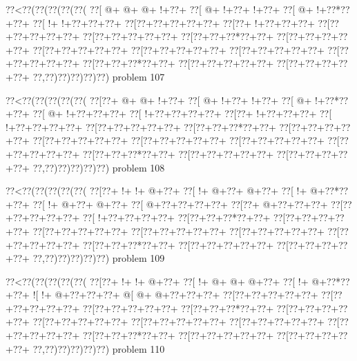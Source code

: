 \vbox{\vbox{\goo
\0??<\0??(\0??(\0??(\0??(\0??(
\0??[\- @+\- @+\- @+\- !+\0??+
\0??[\- @+\- !+\0??+\- !+\0??+
\0??[\- @+\- !+\0??*\0??+\0??+
\0??[\- !+\- !+\0??+\0??+\0??+
\0??[\0??+\0??+\0??+\0??+\0??+
\0??[\0??+\- !+\0??+\0??+\0??+
\0??[\0??+\0??+\0??+\0??+\0??+
\0??[\0??+\0??+\0??+\0??+\0??+
\0??[\0??+\0??+\0??*\0??+\0??+
\0??[\0??+\0??+\0??+\0??+\0??+
\0??[\0??+\0??+\0??+\0??+\0??+
\0??[\0??+\0??+\0??+\0??+\0??+
\0??[\0??+\0??+\0??+\0??+\0??+
\0??[\0??+\0??+\0??+\0??+\0??+
\0??[\0??+\0??+\0??*\0??+\0??+
\0??[\0??+\0??+\0??+\0??+\0??+
\0??[\0??+\0??+\0??+\0??+\0??+
\0??,\0??)\0??)\0??)\0??)\0??)
}
\hfil problem 107\hfil\break
}

\vbox{\vbox{\goo
\0??<\0??(\0??(\0??(\0??(\0??(
\0??[\0??+\- @+\- @+\- !+\0??+
\0??[\- @+\- !+\0??+\- !+\0??+
\0??[\- @+\- !+\0??*\0??+\0??+
\0??[\- @+\- !+\0??+\0??+\0??+
\0??[\- !+\0??+\0??+\0??+\0??+
\0??[\0??+\- !+\0??+\0??+\0??+
\0??[\- !+\0??+\0??+\0??+\0??+
\0??[\0??+\0??+\0??+\0??+\0??+
\0??[\0??+\0??+\0??*\0??+\0??+
\0??[\0??+\0??+\0??+\0??+\0??+
\0??[\0??+\0??+\0??+\0??+\0??+
\0??[\0??+\0??+\0??+\0??+\0??+
\0??[\0??+\0??+\0??+\0??+\0??+
\0??[\0??+\0??+\0??+\0??+\0??+
\0??[\0??+\0??+\0??*\0??+\0??+
\0??[\0??+\0??+\0??+\0??+\0??+
\0??[\0??+\0??+\0??+\0??+\0??+
\0??,\0??)\0??)\0??)\0??)\0??)
}
\hfil problem 108\hfil\break
}

\vbox{\vbox{\goo
\0??<\0??(\0??(\0??(\0??(\0??(
\0??[\0??+\- !+\- !+\- @+\0??+
\0??[\- !+\- @+\0??+\- @+\0??+
\0??[\- !+\- @+\0??*\0??+\0??+
\0??[\- !+\- @+\0??+\- @+\0??+
\0??[\- @+\0??+\0??+\0??+\0??+
\0??[\0??+\- @+\0??+\0??+\0??+
\0??[\0??+\0??+\0??+\0??+\0??+
\0??[\- !+\0??+\0??+\0??+\0??+
\0??[\0??+\0??+\0??*\0??+\0??+
\0??[\0??+\0??+\0??+\0??+\0??+
\0??[\0??+\0??+\0??+\0??+\0??+
\0??[\0??+\0??+\0??+\0??+\0??+
\0??[\0??+\0??+\0??+\0??+\0??+
\0??[\0??+\0??+\0??+\0??+\0??+
\0??[\0??+\0??+\0??*\0??+\0??+
\0??[\0??+\0??+\0??+\0??+\0??+
\0??[\0??+\0??+\0??+\0??+\0??+
\0??,\0??)\0??)\0??)\0??)\0??)
}
\hfil problem 109\hfil\break
}

\vbox{\vbox{\goo
\0??<\0??(\0??(\0??(\0??(\0??(
\0??[\0??+\- !+\- !+\- @+\0??+
\0??[\- !+\- @+\- @+\- @+\0??+
\0??[\- !+\- @+\0??*\0??+\0??+
\- ![\- !+\- @+\0??+\0??+\0??+
\- @[\- @+\- @+\0??+\0??+\0??+
\0??[\0??+\0??+\0??+\0??+\0??+
\0??[\0??+\0??+\0??+\0??+\0??+
\0??[\0??+\0??+\0??+\0??+\0??+
\0??[\0??+\0??+\0??*\0??+\0??+
\0??[\0??+\0??+\0??+\0??+\0??+
\0??[\0??+\0??+\0??+\0??+\0??+
\0??[\0??+\0??+\0??+\0??+\0??+
\0??[\0??+\0??+\0??+\0??+\0??+
\0??[\0??+\0??+\0??+\0??+\0??+
\0??[\0??+\0??+\0??*\0??+\0??+
\0??[\0??+\0??+\0??+\0??+\0??+
\0??[\0??+\0??+\0??+\0??+\0??+
\0??,\0??)\0??)\0??)\0??)\0??)
}
\hfil problem 110\hfil\break
}

